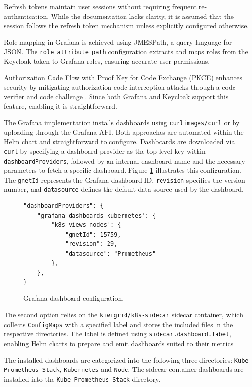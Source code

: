 Refresh tokens maintain user sessions without requiring frequent re-authentication. While the documentation lacks clarity, it is assumed that the session follows the refresh token mechanism unless explicitly configured otherwise.

Role mapping in Grafana is achieved using JMESPath, a query language for JSON. The \texttt{role\_attribute\_path} configuration extracts and maps roles from the Keycloak token to Grafana roles, ensuring accurate user permissions.

Authorization Code Flow with Proof Key for Code Exchange (PKCE) enhances security by mitigating authorization code interception attacks through a code verifier and code challenge \parencite{auth0_pkce}. Since both Grafana and Keycloak support this feature, enabling it is straightforward.

The Grafana implementation installs dashboards using \texttt{curlimages/curl} or by uploading through the Grafana API. Both approaches are automated within the Helm chart and straightforward to configure. Dashboards are downloaded via \texttt{curl} by specifying a dashboard provider as the top-level key within \texttt{dashboard\allowbreak Providers}, followed by an internal dashboard name and the necessary parameters to fetch a specific dashboard. Figure \ref{fig:grafana_dashboard} illustrates this configuration. The \texttt{gnetId} represents the Grafana dashboard ID, \texttt{revision} specifies the version number, and \texttt{datasource} defines the default data source used by the dashboard.

\begin{figure}[h]
    \centering
\begin{verbatim}
"dashboardProviders": {
    "grafana-dashboards-kubernetes": {
        "k8s-views-nodes": {
            "gnetId": 15759,
            "revision": 29,
            "datasource": "Prometheus"
        },
    },
}
\end{verbatim}
    \caption{Grafana dashboard configuration.}
    \label{fig:grafana_dashboard}
\end{figure}

The second option relies on the \texttt{kiwigrid/k8s-sidecar} sidecar container, which collects \texttt{ConfigMaps} with a specified label and stores the included files in the respective directories. The label is defined using \texttt{sidecar.dashboard.label}, enabling Helm charts to prepare and emit dashboards suited to their metrics.

The installed dashboards are categorized into the following three directories: \texttt{Kube Prometheus Stack}, \texttt{Kubernetes} and \texttt{Node}. The sidecar container dashboards are installed into the \texttt{Kube Prometheus Stack} directory.

